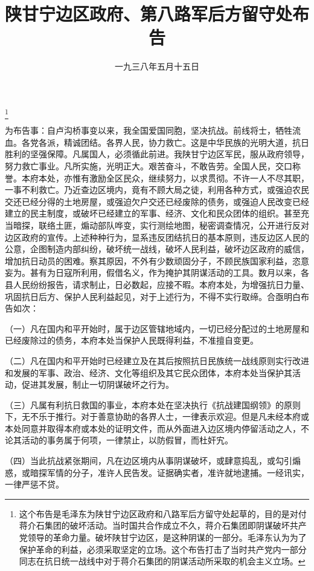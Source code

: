 
\title{陕甘宁边区政府、第八路军后方留守处布告}
\date{一九三八年五月十五日}
\thanks{这个布告是毛泽东为陕甘宁边区政府和八路军后方留守处起草的，目的是对付蒋介石集团的破坏活动。当时国共合作成立不久，蒋介石集团即阴谋破坏共产党领导的革命力量。破坏陕甘宁边区，是这种阴谋的一部分。毛泽东认为为了保护革命的利益，必须采取坚定的立场。这个布告打击了当时共产党内一部分同志在抗日统一战线中对于蒋介石集团的阴谋活动所采取的机会主义立场。}
\maketitle


为布告事：自卢沟桥事变以来，我全国爱国同胞，坚决抗战。前线将士，牺牲流血。各党各派，精诚团结。各界人民，协力救亡。这是中华民族的光明大道，抗日胜利的坚强保障。凡属国人，必须循此前进。我陕甘宁边区军民，服从政府领导，努力救亡事业。凡所实施，光明正大。艰苦奋斗，不敢告劳。全国人民，交口称誉。本府本处，亦惟有激励全区民众，继续努力，以求贯彻。不许一人不尽其职，一事不利救亡。乃近查边区境内，竟有不顾大局之徒，利用各种方式，或强迫农民交还已经分得的土地房屋，或强迫欠户交还已经废除的债务，或强迫人民改变已经建立的民主制度，或破坏已经建立的军事、经济、文化和民众团体的组织。甚至充当暗探，联络土匪，煽动部队哗变，实行测绘地图，秘密调查情况，公开进行反对边区政府的宣传。上述种种行为，显系违反团结抗日的基本原则，违反边区人民的公意，企图制造内部纠纷，破坏统一战线，破坏人民利益，破坏边区政府的威信，增加抗日动员的困难。察其原因，不外有少数顽固分子，不顾民族国家利益，恣意妄为。甚有为日寇所利用，假借名义，作为掩护其阴谋活动的工具。数月以来，各县人民纷纷报告，请求制止，日必数起，应接不暇。本府本处，为增强抗日力量、巩固抗日后方、保护人民利益起见，对于上述行为，不得不实行取缔。合亟明白布告如次：

（一）凡在国内和平开始时，属于边区管辖地域内，一切已经分配过的土地房屋和已经废除过的债务，本府本处当保护人民既得利益，不准擅自变更。

（二）凡在国内和平开始时已经建立及在其后按照抗日民族统一战线原则实行改进和发展的军事、政治、经济、文化等组织及其它民众团体，本府本处当保护其活动，促进其发展，制止一切阴谋破坏之行为。

（三）凡属有利抗日救国的事业，本府本处在坚决执行《抗战建国纲领》的原则下，无不乐于推行。对于善意协助的各界人士，一律表示欢迎。但是凡未经本府或本处同意并取得本府或本处的证明文件，而从外面进入边区境内停留活动之人，不论其活动的事务属于何项，一律禁止，以防假冒，而杜奸宄。

（四）当此抗战紧张期间，凡在边区境内从事阴谋破坏，或肆意捣乱，或勾引煽惑，或暗探军情的分子，准许人民告发。证据确实者，准许就地逮捕。一经讯实，一律严惩不贷。

